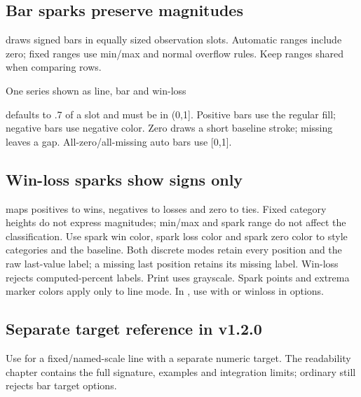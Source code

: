 \subsection{Bar sparks preserve magnitudes}
 draws signed bars in equally sized observation slots.
Automatic ranges include zero; fixed ranges use min/max and normal overflow
rules. Keep ranges shared when comparing rows.
\begin{demo}{One series shown as line, bar and win-loss}


\end{demo}
 defaults to .7 of a slot and must be in (0,1]. Positive
bars use the regular fill; negative bars use negative color. Zero draws a short
baseline stroke; missing leaves a gap. All-zero/all-missing auto bars use [0,1].
\subsection{Win-loss sparks show signs only}
 maps positives to wins, negatives to losses and zero
to ties. Fixed category heights do not express magnitudes; min/max and spark
range do not affect the classification. Use spark win color, spark loss color
and spark zero color to style categories and the baseline.
Both discrete modes retain every position and the raw last-value label; a missing
last position retains its missing label. Win-loss rejects computed-percent labels.
Print uses grayscale. Spark points and extrema marker colors apply only to line
mode. In , use  with  or winloss in options.

\subsection{Separate target reference in v1.2.0}
Use \key{\gradsparktarget} for a fixed/named-scale line with a separate numeric target.
The readability chapter contains the full signature, examples and integration limits;
ordinary \key{\gradspark} still rejects bar target options.
